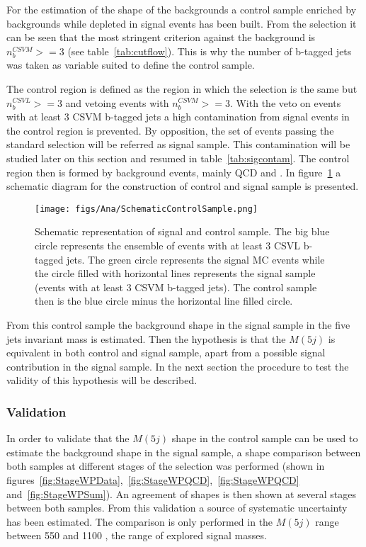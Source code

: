 For the estimation of the shape of the backgrounds a control sample enriched by backgrounds while depleted in signal events has been built. From the selection it can be seen that the most stringent criterion against the background is $n_{b}^{CSVM}>=3$ (see table~\ref{tab:cutflow}). This is why the number of b-tagged jets was taken as variable suited to define the control sample. 

The control region is defined as the region in which  the selection is the same but $n_{b}^{CSVL}>=3$ and vetoing events with $n_{b}^{CSVM}>=3$. With the veto on events with at least 3 CSVM b-tagged jets a high contamination from signal events in the control region is prevented. By opposition, the set of events passing the standard selection will be referred as signal sample.  This contamination will be studied later on this section and resumed in table~\ref{tab:sigcontam}. The control region then is formed by background events, mainly QCD and \ttbar. In figure~\ref{fig:CSSSSche} a schematic diagram for the construction of control and signal sample is presented.

\begin{figure}[!Hhtbp]
  \begin{center}
    \texttt{[image: figs/Ana/SchematicControlSample.png]}
    \caption{Schematic representation of signal and control sample. The big blue circle represents the ensemble of events with at least 3 CSVL b-tagged jets. The green circle represents the signal MC events while the circle filled with horizontal lines represents the signal sample (events with at least 3 CSVM b-tagged jets). The control sample then is the blue circle minus the horizontal line filled circle.}
    \label{fig:CSSSSche}
  \end{center}
\end{figure}

From this control sample the background shape in the signal sample in the five jets invariant mass is estimated. Then the hypothesis is that the $M(5j)$ is equivalent in both control and signal sample, apart from a possible signal contribution in the signal sample. In the next section the procedure to test the validity of this hypothesis will be described. 

\subsubsection{Validation}
\label{sec:validation}

In order to validate that the $M(5j)$ shape in the control sample can be used to estimate the background shape in the signal sample, a shape comparison between both samples at different stages of the selection was performed (shown in figures~\ref{fig:StageWPData},~\ref{fig:StageWPQCD},~\ref{fig:StageWPQCD} and~\ref{fig:StageWPSum}). An agreement of shapes is then shown at several stages between both samples. From this validation a source of systematic uncertainty has been estimated. The comparison is only performed in the $M(5j)$ range between 550 and 1100 \GeVcc, the range of explored signal masses.

